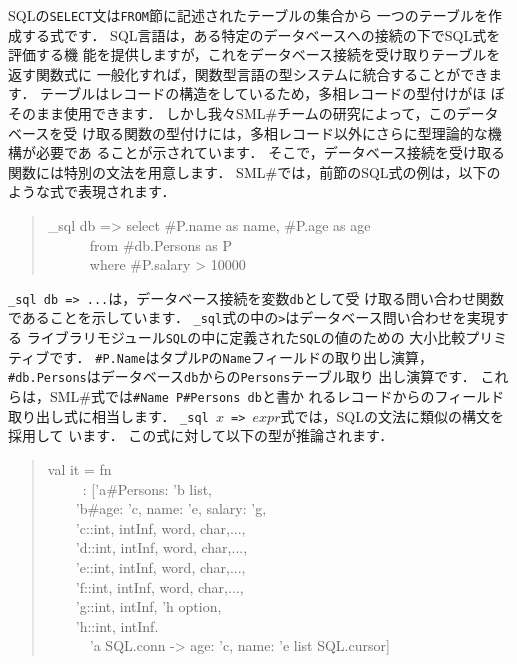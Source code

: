 \documentclass{jbook}
\newcommand{\smlsharp}{SML\#}
\newcommand{\myem}{\mbox{\ \ }}
\newenvironment{program}{\begin{quote}\begin{tt}}%
                        {\end{tt}\end{quote}}
\begin{document}
\ifjp%
	SQLの{\tt SELECT}文は{\tt FROM}節に記述されたテーブルの集合から
一つのテーブルを作成する式です．
	SQL言語は，ある特定のデータベースへの接続の下でSQL式を評価する機
能を提供しますが，これをデータベース接続を受け取りテーブルを返す関数式に
一般化すれば，関数型言語の型システムに統合することができます．
	テーブルはレコードの構造をしているため，多相レコードの型付けがほ
ぼそのまま使用できます．
	しかし我々\smlsharp{}チームの研究によって，このデータベースを受
け取る関数の型付けには，多相レコード以外にさらに型理論的な機構が必要であ
ることが示されています\cite{ohori11}．
	そこで，データベース接続を受け取る関数には特別の文法を用意します．
	\smlsharp{}では，前節のSQL式の例は，以下のような式で表現されます．
\begin{program}
\_sql db => select \#P.name as name, \#P.age as age\\
\myem\myem\myem from \#db.Persons as P\\
\myem\myem\myem where \#P.salary > 10000
\end{program}
	{\tt \_sql db => ...}は，データベース接続を変数{\tt db}として受
け取る問い合わせ関数であることを示しています．
	{\tt \_sql}式の中の{\tt >}はデータベース問い合わせを実現する
ライブラリモジュール{\tt SQL}の中に定義された{\tt SQL}の値のための
大小比較プリミティブです．
	{\tt \#P.Name}はタプル{\tt P}の{\tt Name}フィールドの取り出し演算，
{\tt \#db.Persons}はデータベース{\tt db}からの{\tt Persons}テーブル取り
出し演算です．
	これらは，\smlsharp{}式では{\tt \#Name P}{\tt \#Persons db}と書か
れるレコードからのフィールド取り出し式に相当します．
	{\tt \_sql $x$ => $expr$}式では，SQLの文法に類似の構文を採用して
います．
	この式に対して以下の型が推論されます．
\begin{program}
val it = fn
\\\myem\ \ \    : ['a\#{Persons: 'b list},
\\\myem\myem     'b\#{age: 'c, name: 'e, salary: 'g},
\\\myem\myem     'c::{int, intInf, word, char,...},
\\\myem\myem     'd::{int, intInf, word, char,...},
\\\myem\myem     'e::{int, intInf, word, char,...},
\\\myem\myem     'f::{int, intInf, word, char,...},
\\\myem\myem     'g::{int, intInf, 'h option},
\\\myem\myem     'h::{int, intInf}.
\\\myem\myem\myem       'a SQL.conn -> {age: 'c, name: 'e} list SQL.cursor]
\end{program}
\end{document}
